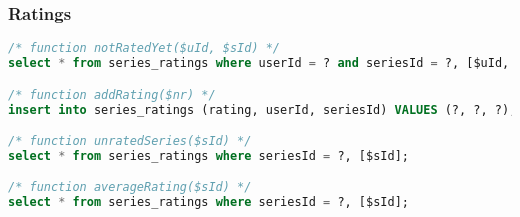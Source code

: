 \subsubsection{Ratings}
\begin{lstlisting}[language=sql]
/* function notRatedYet($uId, $sId) */
select * from series_ratings where userId = ? and seriesId = ?, [$uId, $sId];

/* function addRating($nr) */
insert into series_ratings (rating, userId, seriesId) VALUES (?, ?, ?), [$nr->rating, $nr->userId, $nr->seriesId];

/* function unratedSeries($sId) */
select * from series_ratings where seriesId = ?, [$sId];

/* function averageRating($sId) */
select * from series_ratings where seriesId = ?, [$sId];

\end{lstlisting}
